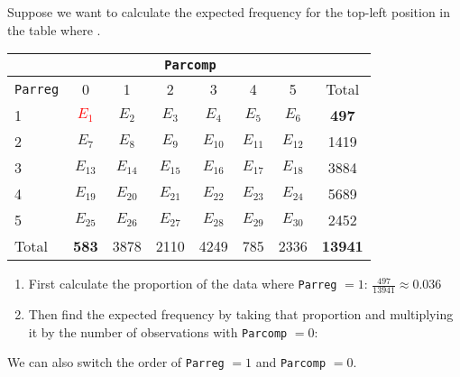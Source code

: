 \documentclass{beamer}
\begin{document}
\begin{frame}
Suppose we want to calculate the expected frequency for the top-left
position in the table where . 
\footnotesize
\pause
\begin{table}
\begin{center}
\begin{tabular}{l|cccccc|c}
& \multicolumn{6}{c}{{\tt Parcomp}} & \\
\hline
{\tt Parreg} & 0 & 1 & 2 & 3 & 4 & 5 & Total\\
\hline
1 & \textcolor{red}{$E_1$} & $E_2$ & $E_3$ & $E_4$ &  $E_5$ & $E_6$ & \textbf{497} \\
2 & $E_7$ & $E_8$ & $E_9$ & $E_{10}$ &  $E_{11}$ & $E_{12}$ & 1419\\
3 &  $E_{13}$ & $E_{14}$ & $E_{15}$ & $E_{16}$ &  $E_{17}$ & $E_{18}$ & 3884\\
4 & $E_{19}$ & $E_{20}$ & $E_{21}$ & $E_{22}$ &  $E_{23}$ & $E_{24}$ & 5689\\
5 & $E_{25}$ & $E_{26}$ & $E_{27}$ & $E_{28}$ &  $E_{29}$ & $E_{30}$ & 2452\\
\hline
Total & \textbf{583} & 3878 & 2110 & 4249 & 785 & 2336 & \textbf{13941}\\
\end{tabular}
\end{center}
\end{table}
\normalsize
\pause
\begin{enumerate}
\item First calculate the proportion of the data where {\tt Parreg} $= 1$: \pause
$\frac{497}{13941} \approx 0.036$
\pause
\item Then find the expected frequency by taking that proportion and
multiplying it by the number of observations with {\tt Parcomp} $=0$:
\pause {} 
\pause
\end{enumerate}
\bigskip
We can also switch the order of {\tt Parreg} $=1$ and {\tt Parcomp} $=0$.
\end{frame}
\end{document}
